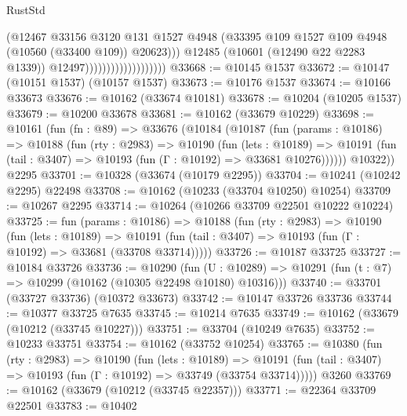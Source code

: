 \begin{lexlean}{RustStd}
\begin{coremodule}
                                            (@12467
                                              @33156
                                              @3120
                                              @131
                                              @1527
                                              @4948
                                              (@33395
                                                @109
                                                @1527
                                                @109
                                                @4948
                                                (@10560 (@33400 @109))
                                                @20623)))
                                          @12485
                                          (@10601 (@12490 @22 @2283 @1339))
                                          @12497)))))))))))))))))))
@33668 := @10145 @1537
@33672 := @10147 (@10151 @1537) (@10157 @1537)
@33673 := @10176 @1537
@33674 := @10166 @33673
@33676 := @10162 (@33674 @10181)
@33678 := @10204 (@10205 @1537)
@33679 := @10200 @33678
@33681 := @10162 (@33679 @10229)
@33698 := @10161
    (fun (fn : @89) =>
    @33676
      (@10184
        (@10187
          (fun (params : @10186) =>
          @10188
            (fun (rty : @2983) =>
            @10190
              (fun (lets : @10189) =>
              @10191 (fun (tail : @3407) => @10193 (fun (Γ : @10192) => @33681 @10276))))))
        @10322))
    @2295
@33701 := @10328 (@33674 (@10179 @2295))
@33704 := @10241 (@10242 @2295) @22498
@33708 := @10162 (@10233 (@33704 @10250) @10254)
@33709 := @10267 @2295
@33714 := @10264 (@10266 @33709 @22501 @10222 @10224)
@33725 := fun (params : @10186) =>
  @10188
    (fun (rty : @2983) =>
    @10190
      (fun (lets : @10189) =>
      @10191 (fun (tail : @3407) => @10193 (fun (Γ : @10192) => @33681 (@33708 @33714)))))
@33726 := @10187 @33725
@33727 := @10184 @33726
@33736 := @10290
    (fun (U : @10289) => @10291 (fun (t : @7) => @10299 (@10162 (@10305 @22498 @10180) @10316)))
@33740 := @33701 (@33727 @33736) (@10372 @33673)
@33742 := @10147 @33726 @33736
@33744 := @10377 @33725 @7635
@33745 := @10214 @7635
@33749 := @10162 (@33679 (@10212 (@33745 @10227)))
@33751 := @33704 (@10249 @7635)
@33752 := @10233 @33751
@33754 := @10162 (@33752 @10254)
@33765 := @10380
    (fun (rty : @2983) =>
    @10190
      (fun (lets : @10189) =>
      @10191 (fun (tail : @3407) => @10193 (fun (Γ : @10192) => @33749 (@33754 @33714)))))
    @3260
@33769 := @10162 (@33679 (@10212 (@33745 @22357)))
@33771 := @22364 @33709 @22501
@33783 := @10402

\end{coremodule}
\end{lexlean}
